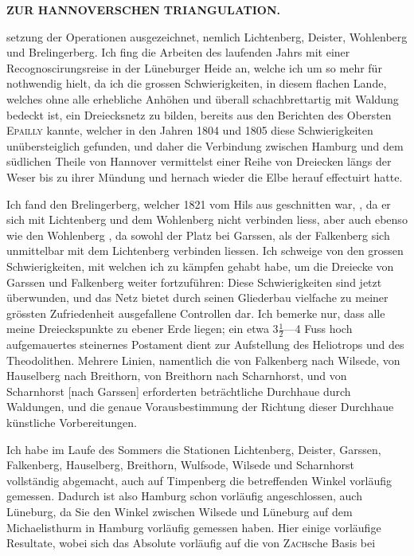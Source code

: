 \par\clearpage
\noindent{}\hfill{\small\textbf{ZUR HANNOVERSCHEN TRIANGULATION.}}\hfill\null\par\medskip
\noindent setzung der Operationen ausgezeichnet, nemlich Lichtenberg, Deister, Wohlenberg und Brelingerberg. Ich fing die Arbeiten des laufenden Jahrs mit einer Recognoscirungsreise in der Lüneburger Heide an, welche ich um so mehr für nothwendig hielt, da ich die grossen Schwierigkeiten, in diesem flachen Lande, welches ohne alle erhebliche Anhöhen und überall schachbrettartig mit Waldung bedeckt ist, ein Dreiecksnetz zu bilden, bereits aus den Berichten des Obersten \textsc{Epailly} kannte, welcher in den Jahren 1804 und 1805 diese Schwierigkeiten unübersteiglich gefunden, und daher die Verbindung zwischen Hamburg und dem südlichen Theile von Hannover vermittelst einer Reihe von Dreiecken längs der Weser bis zu ihrer Mündung und hernach wieder die Elbe herauf effectuirt hatte.
\par\noindent\hspace*{\parindent}Ich fand den Brelingerberg, welcher 1821 vom Hils aus geschnitten war, , da er sich mit Lichtenberg und dem Wohlenberg nicht verbinden liess, aber auch ebenso wie den Wohlenberg , da sowohl der Platz bei Garssen, als der Falkenberg sich unmittelbar mit dem Lichtenberg verbinden liessen. Ich schweige von den grossen Schwierigkeiten, mit welchen ich zu kämpfen gehabt habe, um die Dreiecke von Garssen und Falkenberg weiter fortzuführen: Diese Schwierigkeiten sind jetzt überwunden, und das Netz bietet durch seinen Gliederbau vielfache zu meiner grössten Zufriedenheit ausgefallene Controllen dar. Ich bemerke nur, dass alle meine Dreieckspunkte zu ebener Erde liegen; ein etwa \(3\frac{1}{2}\)---4 Fuss hoch aufgemauertes steinernes Postament dient zur Aufstellung des Heliotrops und des Theodolithen. Mehrere Linien, namentlich die von Falkenberg nach Wilsede, von Hauselberg nach Breithorn, von Breithorn nach Scharnhorst, und von Scharnhorst [nach Garssen] erforderten beträchtliche Durchhaue durch Waldungen, und die genaue Vorausbestimmung der Richtung dieser Durchhaue künstliche Vorbereitungen.
\par\noindent\hspace*{\parindent}Ich habe im Laufe des Sommers die Stationen Lichtenberg, Deister, Garssen, Falkenberg, Hauselberg, Breithorn, Wulfsode, Wilsede und Scharnhorst vollständig abgemacht, auch auf Timpenberg die betreffenden Winkel vorläufig gemessen. Dadurch ist also Hamburg schon vorläufig angeschlossen, auch Lüneburg, da Sie den Winkel zwischen Wilsede und Lüneburg auf dem Michaelisthurm in Hamburg vorläufig gemessen haben. Hier einige vorläufige Resultate, wobei sich das Absolute vorläufig auf die von \textsc{Zach}sche Basis bei

